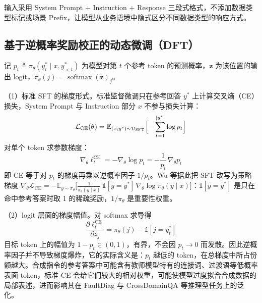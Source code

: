 \documentclass[fontset=fandol,type=master,campus=shenzhen,etitleauto=true]{hithesisbook}
\begin{document}
输入采用 System Prompt + Instruction + Response 三段式格式，不添加数据类型标记或场景 Prefix，让模型从业务语境中隐式区分不同数据类型的响应方式。

\subsection{基于逆概率奖励校正的动态微调（DFT）}\label{ux8badux7ec3ux914dux7f6eux4e0eux4f18ux5316}

记 $p_t \triangleq \pi_\theta(y_t^* \mid x, y_{<t}^*)$ 为模型对第 $t$ 个参考 token 的预测概率，$\mathbf{z}$ 为该位置的输出 logit，$\pi_\theta(j) = \operatorname{softmax}(\mathbf{z})_j$。

（1）标准 SFT 的梯度形式。标准监督微调只在参考回答 $y^*$ 上计算交叉熵（CE）损失，System Prompt 与 Instruction 部分 $x$ 不参与损失计算：
\begin{equation}
\mathcal{L}_{\text{CE}}(\theta) = \mathbb{E}_{(x, y^*) \sim \mathcal{D}_{\text{SFT}}} \Bigl[ -\sum_{t=1}^{|y^*|} \log p_t \Bigr]
\end{equation}
对单个 token 求参数梯度：
\begin{equation}\label{eq:ce-grad}
\nabla_\theta \ell_t^{\text{CE}} = -\nabla_\theta \log p_t = -\frac{1}{p_t}\,\nabla_\theta p_t
\end{equation}
即 CE 等于对 $p_t$ 的梯度再乘以逆概率因子 $1/p_t$。Wu 等\cite{ref82}据此把 SFT 改写为策略梯度 $\nabla_\theta \mathcal{L}_{\text{CE}} = -\mathbb{E}_{y \sim \pi_\theta}\bigl[\tfrac{1}{\pi_\theta(y \mid x)}\,\mathbb{1}[y = y^*]\,\nabla_\theta \log \pi_\theta(y \mid x)\bigr]$：$\mathbb{1}[y = y^*]$ 是只在命中参考答案时取 1 的稀疏奖励，$1/\pi_\theta$ 是重要性权重。

（2）logit 层面的梯度幅值。对 softmax 求导得
\begin{equation}\label{eq:ce-logit}
\frac{\partial \ell_t^{\text{CE}}}{\partial z_j} = \pi_\theta(j) - \mathbb{1}[j = y_t^*]
\end{equation}
目标 token 上的幅值为 $1 - p_t \in (0, 1)$，有界，不会因 $p_t \to 0$ 而发散。因此逆概率因子并不导致梯度爆炸，它的实际含义是：$p_t$ 越低的 token，在总梯度中所占份额越大。合成指令的参考答案中可能含有教师模型特有的连接词、过渡语等低概率表面 token，标准 CE 会给它们较大的相对权重，可能使模型过度拟合合成数据的局部表述，进而影响其在 FaultDiag 与 CrossDomainQA 等推理型任务上的泛化。
\end{document}
